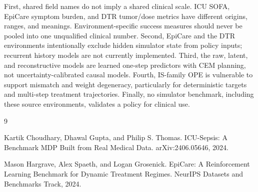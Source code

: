 \documentclass[10pt,twocolumn]{article}
\begin{document}
First, shared field names do not imply a shared clinical scale. ICU SOFA, EpiCare symptom burden, and DTR tumor/dose metrics have different origins, ranges, and meanings. Environment-specific success measures should never be pooled into one unqualified clinical number. Second, EpiCare and the DTR environments intentionally exclude hidden simulator state from policy inputs; recurrent history models are not currently implemented. Third, the raw, latent, and reconstructive models are learned one-step predictors with CEM planning, not uncertainty-calibrated causal models. Fourth, IS-family OPE is vulnerable to support mismatch and weight degeneracy, particularly for deterministic targets and multi-step treatment trajectories. Finally, no simulator benchmark, including these source environments, validates a policy for clinical use.

\begin{thebibliography}{9}

Kartik Choudhary, Dhawal Gupta, and Philip S. Thomas.
\newblock ICU-Sepsis: A Benchmark MDP Built from Real Medical Data.
\newblock arXiv:2406.05646, 2024.

Mason Hargrave, Alex Spaeth, and Logan Grosenick.
\newblock EpiCare: A Reinforcement Learning Benchmark for Dynamic Treatment Regimes.
\newblock NeurIPS Datasets and Benchmarks Track, 2024.

\end{thebibliography}
\end{document}
